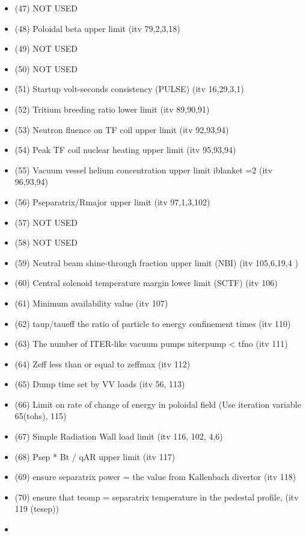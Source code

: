 \documentclass[]{article}
\begin{document}
\begin{itemize}
\begin{itemize}
  \item
    (47) NOT USED
  \item
    (48) Poloidal beta upper limit (itv 79,2,3,18)
  \item
    (49) NOT USED
  \item
    (50) NOT USED
  \item
    (51) Startup volt-seconds consistency (PULSE) (itv 16,29,3,1)
  \item
    (52) Tritium breeding ratio lower limit (itv 89,90,91)
  \item
    (53) Neutron fluence on TF coil upper limit (itv 92,93,94)
  \item
    (54) Peak TF coil nuclear heating upper limit (itv 95,93,94)
  \item
    (55) Vacuum vessel helium concentration upper limit iblanket =2 (itv
    96,93,94)
  \item
    (56) Pseparatrix/Rmajor upper limit (itv 97,1,3,102)
  \item
    (57) NOT USED
  \item
    (58) NOT USED
  \item
    (59) Neutral beam shine-through fraction upper limit (NBI) (itv
    105,6,19,4 )
  \item
    (60) Central solenoid temperature margin lower limit (SCTF) (itv
    106)
  \item
    (61) Minimum availability value (itv 107)
  \item
    (62) taup/taueff the ratio of particle to energy confinement times
    (itv 110)
  \item
    (63) The number of ITER-like vacuum pumps niterpump \textless{} tfno
    (itv 111)
  \item
    (64) Zeff less than or equal to zeffmax (itv 112)
  \item
    (65) Dump time set by VV loads (itv 56, 113)
  \item
    (66) Limit on rate of change of energy in poloidal field (Use
    iteration variable 65(tohs), 115)
  \item
    (67) Simple Radiation Wall load limit (itv 116, 102, 4,6)
  \item
    (68) Psep * Bt / qAR upper limit (itv 117)
  \item
    (69) ensure separatrix power = the value from Kallenbach divertor
    (itv 118)
  \item
    (70) ensure that teomp = separatrix temperature in the pedestal
    profile, (itv 119 (tesep))
  \item

\end{itemize}
\end{itemize}
\end{document}
